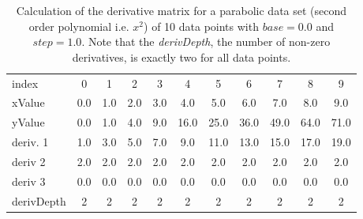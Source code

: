 \documentclass[main.tex]{subfiles}
\begin{document}
  
  \begin{table}[h]
    \caption{Calculation of the derivative matrix for a parabolic data set (second order polynomial i.e. $x^2$) of 10 data points with $base=0.0$ and $step=1.0$. Note that the \textit{derivDepth}, the number of non-zero derivatives, is exactly two for all data points.}
    \centering
    \begin{tabularx}{0.85\textwidth}{ X | c c c c c c c c c c }
      index & 0 & 1 & 2 & 3 & 4 & 5 & 6 & 7 & 8 & 9 \\
      xValue & 0.0 & 1.0 & 2.0 & 3.0 & 4.0 & 5.0 & 6.0 & 7.0 & 8.0 & 9.0 \\
      \hline \hline
      yValue & 0.0 & 1.0 & 4.0 & 9.0 & 16.0 & 25.0 & 36.0 &  49.0 & 64.0 & 71.0 \\
      \hline
      deriv. 1 & 1.0 & 3.0 & 5.0 & 7.0 & 9.0 & 11.0 & 13.0 & 15.0 & 17.0 & 19.0 \\
      deriv 2 & 2.0 & 2.0 & 2.0 & 2.0 & 2.0 & 2.0 & 2.0 & 2.0 & 2.0 & 2.0 \\
      deriv 3 & 0.0 & 0.0 & 0.0 & 0.0 & 0.0 & 0.0 & 0.0 & 0.0 & 0.0 & 0.0 \\   
      \hline
      derivDepth & 2 & 2 & 2 & 2 & 2 & 2 & 2 & 2 & 2 & 2 \\   
    \end{tabularx}
    \label{tbl:mtrx:simple}
  \end{table}
  
\end{document}
